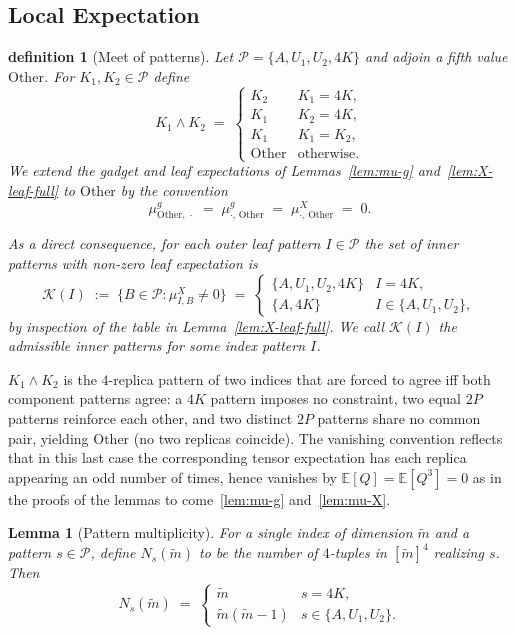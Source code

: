 \documentclass[12pt,a4paper]{article}
\newtheorem{lemma}[theorem]{Lemma}
\newtheorem{definition}[theorem]{definition}
\begin{document}
\subsection{Local Expectation\label{sec:local_expectation}}

\begin{definition}[Meet of patterns]\label{def:meet}
Let $\mathcal{P} = \{A, U_{1}, U_{2}, 4K\}$ and adjoin a fifth value 
$\mathrm{Other}$. For $K_{1}, K_{2} \in \mathcal{P}$ define
\[
K_{1} \wedge K_{2} \;=\;
\begin{cases}
K_{2} & K_{1} = 4K, \\
K_{1} & K_{2} = 4K, \\
K_{1} & K_{1} = K_{2}, \\
\mathrm{Other} & \text{otherwise.}
\end{cases}
\]
We extend the gadget and leaf expectations of Lemmas~\ref{lem:mu-g} 
and~\ref{lem:X-leaf-full} to $\mathrm{Other}$ by the convention
\[
\mu^{g}_{\mathrm{Other},\,\cdot} \;=\; \mu^{g}_{\cdot,\,\mathrm{Other}} 
\;=\; \mu^{X}_{\cdot,\,\mathrm{Other}} \;=\; 0.
\]

As a direct consequence, for each outer leaf pattern $I\in\mathcal{P}$ 
the set of inner patterns with non-zero leaf expectation is
\[
\mathcal{K}(I) \;:=\; \{B\in\mathcal{P}:\mu^{X}_{I,B}\neq 0\} \;=\;
\begin{cases}
\{A,U_{1},U_{2},4K\} & I=4K,\\
\{A,4K\} & I\in\{A,U_{1},U_{2}\},
\end{cases}\label{eq:K_I_remain}
\]
by inspection of the table in Lemma~\ref{lem:X-leaf-full}. We call 
$\mathcal{K}(I)$ the \emph{admissible inner patterns} for some index pattern $I$.
\end{definition}

$K_{1} \wedge K_{2}$ is the $4$-replica pattern of two indices that are forced to agree iff both component patterns agree: 
a $4K$ pattern imposes no constraint, two equal $2P$ patterns reinforce 
each other, and two distinct $2P$ patterns share no common pair, 
yielding $\mathrm{Other}$ (no two replicas coincide). The vanishing 
convention reflects that in this last case the corresponding tensor 
expectation has each replica appearing an odd number of times, hence 
vanishes by $\mathbb{E}[Q] = \mathbb{E}[Q^{3}] = 0$ as in the proofs 
of the lemmas to come~\ref{lem:mu-g} and~\ref{lem:mu-X}.


\begin{lemma}[Pattern multiplicity]\label{lem:N-count}
For a single index of dimension $\widetilde m$ and a pattern $s \in \mathcal{P}$, 
define $N_{s}(\widetilde m)$ to be the number of $4$-tuples in 
$[\widetilde m]^{4}$ realizing $s$. Then
\[
N_{s}(\widetilde m) \;=\;
\begin{cases}
\widetilde m & s = 4K, \\
\widetilde m (\widetilde m - 1) & s \in \{A, U_{1}, U_{2}\}.
\end{cases}
\]
\end{lemma}
\end{document}

